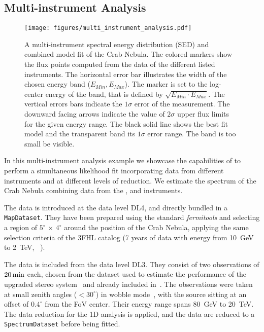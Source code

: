 \documentclass[longauth]{aa}
\newcommand{\code}[1]{\texttt{#1}}
\begin{document}
\subsection{Multi-instrument Analysis}
\label{ssec:multi-instrument-analysis}
%
\begin{figure*}[t]
	\sidecaption
	\texttt{[image: figures/multi\_instrument\_analysis.pdf]}
	\caption{
        A multi-instrument spectral energy distribution (SED) and combined model fit
        of the Crab Nebula. The  colored markers show the flux points computed from
        the data of the different listed instruments. The horizontal error bar
        illustrates the width of the chosen energy band ($E_{Min}, E_{Max}$).
        The marker is set to the log-center energy of the band, that is
        defined by $\sqrt{E_{Min} \cdot E_{Max}}$. The vertical errors bars
        indicate the $1\sigma$ error of the measurement. The downward
        facing arrows indicate the value of $2\sigma$ upper flux limits
        for the given energy range. The black solid line shows the best
        fit model and the transparent band its $1\sigma$ error range.
		The band is too small be visible.
    }
	\label{fig:multi_instrument_analysis}
\end{figure*}
%
In this multi-instrument analysis example we showcase the capabilities of
\gammapy to perform a simultaneous likelihood fit incorporating data from
different instruments and at different levels of reduction. We estimate the
spectrum of the Crab Nebula combining data from the \fermi, \magic and \hawc
instruments.

The \fermi data is introduced at the data level DL4, and directly bundled in a
\code{MapDataset}. They have been prepared using the standard \textit{fermitools} \citep{Fermitools2019} and
selecting a region of $5^{\circ}\,\times\,4^{\circ}$ around the
position of the Crab Nebula, applying the same selection criteria of the 3FHL
catalog (7 years of data with energy from \SI{10}{GeV} to \SI{2}{TeV},
~\citealt{3FHL}).

The \magic data is included from the data level DL3. They consist of two
observations of $20\,{\rm min}$ each, chosen from the dataset used to estimate
the performance of the upgraded stereo system~\citep{magic_performance} and
already included in~\cite{joint_crab}. The observations were taken at small
zenith angles ($<30^{\circ}$) in wobble mode~\citep{fomin_1994}, with the
source sitting at an offset of $0.4^{\circ}$ from the FoV center. Their energy
range spans \SI{80}{GeV} to \SI{20}{TeV}. The data reduction for the 1D analysis
is applied, and the data are reduced to a \code{SpectrumDataset} before being fitted.
\end{document}
